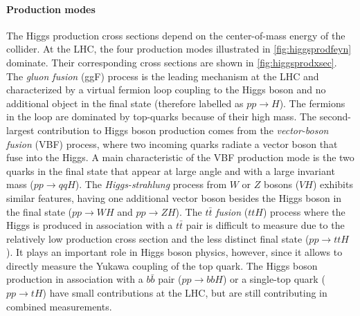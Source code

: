 \paragraph{Production modes} The Higgs production cross sections depend on the center-of-mass energy of the collider.
At the LHC, the four production modes illustrated in \cref{fig:higgsprodfeyn} dominate.
Their corresponding cross sections are shown in \cref{fig:higgsprodxsec}.
The \emph{gluon fusion} (ggF) process is the leading mechanism at the LHC and characterized by a virtual fermion loop coupling to the Higgs boson and no additional object in the final state (therefore labelled as $pp\rightarrow H$). 
The fermions in the loop are dominated by top-quarks because of their high mass. 
The second-largest contribution to Higgs boson production comes from the \emph{vector-boson fusion} (VBF) process, where two incoming quarks radiate a vector boson that fuse into the Higgs.
A main characteristic of the VBF production mode is the two quarks in the final state that appear at large angle and with a large invariant mass ($pp\rightarrow qqH$).
The \emph{Higgs-strahlung} process from $W$ or $Z$ bosons ($VH$) exhibits similar features, having one additional vector boson besides the Higgs boson in the final state ($pp \rightarrow WH$ and $pp \rightarrow ZH$).
The $t\bar{t}$ \emph{fusion} ($ttH$) process where the Higgs is produced in association with a $t\bar{t}$ pair is difficult to measure due to the relatively low production cross section and the less distinct final state ($pp \rightarrow ttH$). It plays an important role in Higgs boson physics, however, since it allows to directly measure the Yukawa coupling of the top quark. 
The Higgs boson production in association with a $b\bar{b}$ pair ($pp\rightarrow bbH$) or a single-top quark ($pp \rightarrow tH$) have small contributions at the LHC, but are still contributing in combined measurements.

